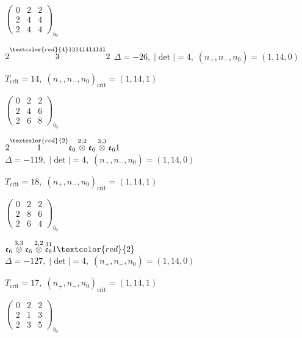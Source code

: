 \documentclass[10pt]{article}
\begin{document}
\hspace{2em}$\left(\begin{smallmatrix}0 & 2 & 2 \\ 2 & 4 & 4 \\ 2 & 4 & 4\end{smallmatrix}\right)_{\!b_0}$

\smallskip

$2\overset{\textcolor{red}{4}13141414141}{3}2$ \quad $\Delta=-26,\; |\det|=4,\; (n_+,n_-,n_0)=(1,14,0)$

\hspace{1em}$T_{\text{crit}}=14,\; (n_+,n_-,n_0)_{\text{crit}}=(1,14,1)$

\hspace{2em}$\left(\begin{smallmatrix}0 & 2 & 2 \\ 2 & 4 & 6 \\ 2 & 6 & 8\end{smallmatrix}\right)_{\!b_0}$

\smallskip

$2\overset{\textcolor{red}{2}}{1}\mathfrak{e}_6\overset{2,2}{\otimes}\mathfrak{e}_6\overset{3,3}{\otimes}\mathfrak{e}_61$ \quad $\Delta=-119,\; |\det|=4,\; (n_+,n_-,n_0)=(1,14,0)$

\hspace{1em}$T_{\text{crit}}=18,\; (n_+,n_-,n_0)_{\text{crit}}=(1,14,1)$

\hspace{2em}$\left(\begin{smallmatrix}0 & 2 & 2 \\ 2 & 8 & 6 \\ 2 & 6 & 4\end{smallmatrix}\right)_{\!b_0}$

\smallskip

$\mathfrak{e}_6\overset{3,3}{\otimes}\mathfrak{e}_6\overset{2,2}{\otimes}\overset{31}{\mathfrak{e}_6}1\textcolor{red}{2}$ \quad $\Delta=-127,\; |\det|=4,\; (n_+,n_-,n_0)=(1,14,0)$

\hspace{1em}$T_{\text{crit}}=17,\; (n_+,n_-,n_0)_{\text{crit}}=(1,14,1)$

\hspace{2em}$\left(\begin{smallmatrix}0 & 2 & 2 \\ 2 & 1 & 3 \\ 2 & 3 & 5\end{smallmatrix}\right)_{\!b_0}$
\end{document}
